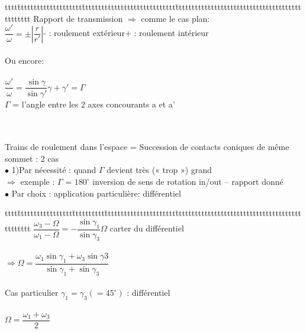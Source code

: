 \begin{bluebox}
\begin{tabbing}
tttt\=tttttttttttttttttttt\=ttttttttttttttttttttttttttttt\=ttttttttttttttttttttttttttttttttttttttttttttttt\kill
Rapport de transmission $\Rightarrow$ comme le cas plan:\\
$\dfrac{\omega'}{\omega} = \pm \left|\dfrac{r}{r'}\right|$\>\>- : roulement extérieur\>+ : roulement intérieur\\\\
Ou encore:\\\\
$\dfrac{\omega'}{\omega} = \dfrac{\sin\gamma}{\sin\gamma'}$\>\>$\gamma+\gamma'=\Gamma$\\
\>\>$\Gamma$ = l'angle entre les 2 axes concourants a et a'
\end{tabbing}
\end{bluebox}\\\\

{\color{orange}Trains de roulement dans l’espace} = Succession de contacts coniques de même sommet : 2 cas\\
$\bullet$ 1)Par nécessité : quand $\Gamma$ devient très (« trop ») grand\\
$\Rightarrow$ exemple : $\Gamma$ = $180^\circ$ inversion de sens de rotation in/out – rapport donné\\
$\bullet$ Par choix : application particulière: différentiel\\

\begin{bluebox}
\begin{tabbing}
tttt\=ttttttttttttttttt\=tttttttttt\=tttttttttttttttttttttt\=ttttttttttttttttttttttttttttttttttttttttttttttt\kill
$\dfrac{\omega_3-\Omega}{\omega_1-\Omega} = -\dfrac{\sin\gamma_1}{\sin\gamma_3}$\>\>\>\>$\Omega$ carter du différentiel\\\\
\>\>$\Rightarrow \Omega = \dfrac{\omega_1\sin\gamma_1+\omega_3\sin\gamma3}{\sin\gamma_1+\sin\gamma_3}$\\\\
Cas particulier $\gamma_1=\gamma_3(= 45^\circ)$ : différentiel\\\\
\>\>\>$\Omega = \dfrac{\omega_1+\omega_3}{2}$
\end{tabbing}
\end{bluebox}\\\\

